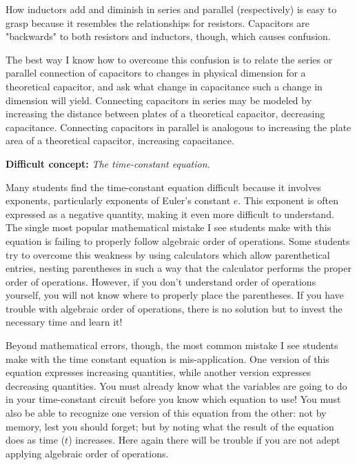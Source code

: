 How inductors add and diminish in series and parallel (respectively) is easy to grasp because it resembles the relationships for resistors.  Capacitors are "backwards" to both resistors and inductors, though, which causes confusion.  

The best way I know how to overcome this confusion is to relate the series or parallel connection of capacitors to changes in physical dimension for a theoretical capacitor, and ask what change in capacitance such a change in dimension will yield.  Connecting capacitors in series may be modeled by increasing the distance between plates of a theoretical capacitor, decreasing capacitance.  Connecting capacitors in parallel is analogous to increasing the plate area of a theoretical capacitor, increasing capacitance.

\vskip 10pt

\noindent
{\bf Difficult concept: } {\it The time-constant equation.}

Many students find the time-constant equation difficult because it involves exponents, particularly exponents of Euler's constant $e$.  This exponent is often expressed as a negative quantity, making it even more difficult to understand.  The single most popular mathematical mistake I see students make with this equation is failing to properly follow algebraic order of operations.  Some students try to overcome this weakness by using calculators which allow parenthetical entries, nesting parentheses in such a way that the calculator performs the proper order of operations.  However, if you don't understand order of operations yourself, you will not know where to properly place the parentheses.  If you have trouble with algebraic order of operations, there is no solution but to invest the necessary time and learn it!

Beyond mathematical errors, though, the most common mistake I see students make with the time constant equation is mis-application.  One version of this equation expresses increasing quantities, while another version expresses decreasing quantities.  You must already know what the variables are going to do in your time-constant circuit before you know which equation to use!  You must also be able to recognize one version of this equation from the other: not by memory, lest you should forget; but by noting what the result of the equation does as time ($t$) increases.  Here again there will be trouble if you are not adept applying algebraic order of operations.

